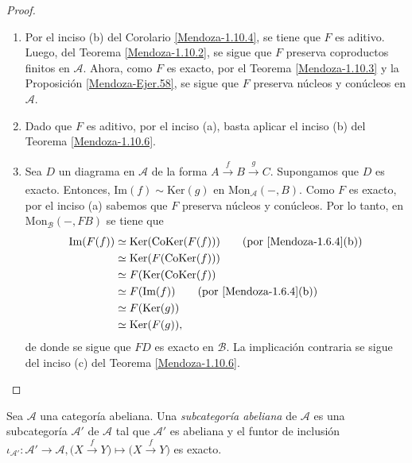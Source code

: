 \documentclass[tesis]{subfiles}
\begin{document}
\begin{proof}\leavevmode

    \begin{enumerate}[label=(\alph*)]
    
        \item Por el inciso (b) del Corolario \ref{Mendoza-1.10.4}, se tiene que $F$ es aditivo. Luego, del Teorema \ref{Mendoza-1.10.2}, se sigue que $F$ preserva coproductos finitos en $\mathscr{A}$. Ahora, como $F$ es exacto, por el Teorema \ref{Mendoza-1.10.3} y la Proposición \ref{Mendoza-Ejer.58}, se sigue que $F$ preserva núcleos y conúcleos en $\mathscr{A}$.

        \item Dado que $F$ es aditivo, por el inciso (a), basta aplicar el inciso (b) del Teorema \ref{Mendoza-1.10.6}.

        \item Sea $D$ un diagrama en $\mathscr{A}$ de la forma $A\xrightarrow[]{f}B\xrightarrow[]{g}C$. Supongamos que $D$ es exacto. Entonces, $\text{Im}(f)\sim\text{Ker}(g)$ en $\text{Mon}_\mathscr{A}(-,B)$. Como $F$ es exacto, por el inciso (a) sabemos que $F$ preserva núcleos y conúcleos. Por lo tanto, en $\text{Mon}_\mathscr{B}(-,FB)$ se tiene que
            \begin{align*}
                \text{Im}(F(f)) &\simeq \text{Ker}(\text{CoKer}(F(f))) \tag{por \ref{Mendoza-1.6.4}(b)} \\
                                &\simeq \text{Ker}(F(\text{CoKer}(f))) \\
                                &\simeq F(\text{Ker}(\text{CoKer}(f)) \\
                                &\simeq F(\text{Im}(f))\tag{por \ref{Mendoza-1.6.4}(b)} \\ 
                                &\simeq F(\text{Ker}(g)) \\
                                &\simeq \text{Ker}(F(g)),
            \end{align*}
            de donde se sigue que $FD$ es exacto en $\mathscr{B}$. La implicación contraria se sigue del inciso (c) del Teorema \ref{Mendoza-1.10.6}.
    \end{enumerate}
\end{proof}

\begin{Def}\label{Def: Subcategoría abeliana}
    
    Sea $\mathscr{A}$ una categoría abeliana. Una \emph{subcategoría abeliana} de $\mathscr{A}$ es una subcategoría $\mathscr{A}'$ de $\mathscr{A}$ tal que $\mathscr{A}'$ es abeliana y el funtor de inclusión $\iota_{\mathscr{A}'}:\mathscr{A}'\to \mathscr{A}, \big( X\xrightarrow[]{f}Y \big) \mapsto \big( X\xrightarrow[]{f} Y\big)$ es exacto.
\end{Def}
\end{document}
